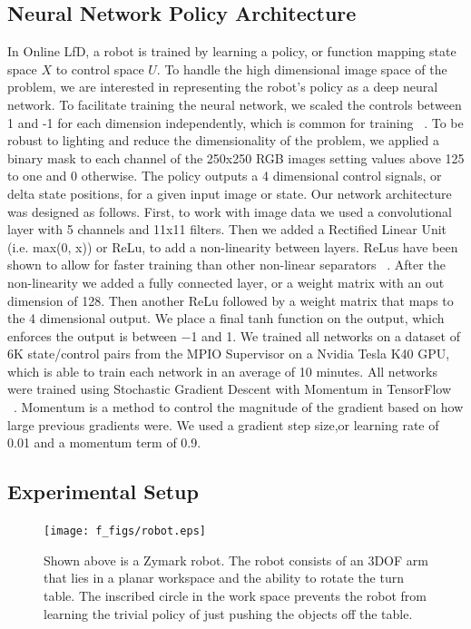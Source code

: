 \documentclass[10pt, conference]{ieeeconf}      %
\begin{document}
\subsection{Neural Network Policy Architecture }
In Online LfD, a robot is trained by learning a policy, or function mapping state
space $X$ to control space $U$. To handle
the high dimensional image space of the problem, we are
interested in representing the robot’s policy as a deep neural
network. To facilitate training the neural network, we scaled the
controls between 1 and -1 for each dimension independently,
which is common for training ~\cite{tensorflow2015-whitepaper}. To be robust to lighting and
reduce the dimensionality of the problem, we applied a binary
mask to each channel of the 250x250 RGB images setting
values above 125 to one and 0 otherwise. The policy outputs
a 4 dimensional control signals, or delta state positions, for a
given input image or state. Our network architecture was designed as follows. First, to
work with image data we used a convolutional layer with 5
channels and 11x11 filters. Then we added a Rectified Linear
Unit (i.e. max(0, x)) or ReLu, to add a non-linearity between
layers. ReLus have been shown to allow for faster training
than other non-linear separators ~\cite{imagenet}. After the non-linearity
we added a fully connected layer, or a weight matrix with
an out dimension of 128. Then another ReLu followed by
a weight matrix that maps to the 4 dimensional output. We
place a final tanh function on the output, which enforces the
output is between −1 and 1.
We trained all networks on a dataset of 6K state/control pairs
from the MPIO Supervisor on a Nvidia Tesla K40 GPU,
which is able to train each network in an average of 10
minutes. All networks were trained using Stochastic Gradient
Descent with Momentum in TensorFlow ~\cite{tensorflow2015-whitepaper}. Momentum is
a method to control the magnitude of the gradient based on
how large previous gradients were. We used a gradient step
size,or learning rate of 0.01 and a momentum term of 0.9.

\subsection{Experimental Setup}
\begin{figure}[t]
\centering

\texttt{[image: f\_figs/robot.eps]}

\caption{\footnotesize  Shown above is a Zymark robot. The robot consists of an 3DOF arm that lies in a planar workspace and the ability to rotate the turn table. The inscribed circle in the work space prevents the robot from learning the trivial policy of just pushing the objects off the table.}

\label{fig:robot}
\end{figure}
\end{document}

